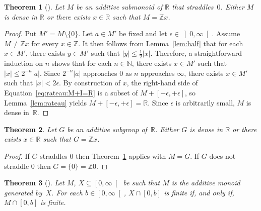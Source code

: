 \documentclass[12pt]{article}
\newcommand{\bZ}{\mathbb{Z}}
\newcommand{\bN}{\mathbb{N}} %
\newcommand{\bR}{\mathbb{R}}
\newcommand{\Rnneg}{\left[0, \infty\right[} %
\newcommand{\Rpos}{\left]0, \infty\right[} %
\newcommand{\abs}[1]{\left| #1 \right|}
\newcommand{\thalf}{\tfrac{1}{2}}
\newtheorem{theorem}{Theorem}
\theoremstyle{definition}
\begin{document}
\begin{theorem}[\cite{AbelsManoussos2012}] \label{thm:additive-submonoid-R}
  Let $M$ be an additive submonoid of $\bR$ that straddles~$0$.
  Either $M$ is dense in $\bR$ or there exists $x \in \bR$ such that $M = \bZ x$.
\end{theorem}

\begin{proof}
  Put $M' = M \setminus \{ 0 \}$.
  Let $a \in M'$ be fixed and let $\epsilon \in \Rpos$.
  Assume $M \ne \bZ x$ for every $x \in \bZ$.
  It then follows from Lemma~\ref{lem:half} that for each $x \in M'$,
  there exists $y \in M'$ such that $\abs{y} \le \thalf \abs{x}$.
  Therefore, a straightforward induction on $n$ shows that for each $n \in \bN$,
  there exists $x \in M'$ such that $\abs{x} \le 2^{- n} \abs{a}$.
  Since $2^{-n} \abs{a}$ approaches $0$ as $n$ approaches $\infty$,
  there exists $x \in M'$ such that $\abs{x} < 2 \epsilon$.
  By construction of $x$,
  the right-hand side of Equation~\eqref{eq:rateau:M+I=R} is a subset of $M + [- \epsilon, + \epsilon]$,
  so Lemma~\ref{lem:rateau} yields $M + [- \epsilon, + \epsilon] = \bR$.
  Since $\epsilon$ is arbitrarily small, $M$ is dense in~$\bR$.
\end{proof}


\begin{theorem} \label{thm:additive-subgroup-R}
  Let $G$ be an additive subgroup of~$\bR$.
  Either $G$ is dense in $\bR$ or there exists $x \in \bR$ such that $G = \bZ x$.
\end{theorem}


\begin{proof}
  If $G$ straddles $0$ then Theorem~\ref{thm:additive-submonoid-R} applies with $M = G$.
  If $G$ does not straddle $0$ then $G = \{ 0 \} = \bZ 0$.
\end{proof}

  

\begin{theorem}[\cite{AbelsManoussos2012}] \label{thm:additive-closure}
  Let $M$, $X \subseteq \Rnneg$ be such that $M$ is the additive monoid generated by~$X$.
  For each $b \in \Rnneg$,
  $X \cap [0, b]$ is finite
  if, and only if,
  $M \cap [0, b]$ is finite.
\end{theorem}
\end{document}
